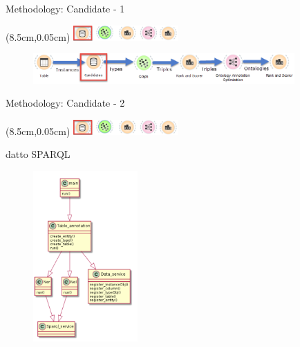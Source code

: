 \documentclass{beamer}
\begin{document}
\begin{frame}{Methodology: Candidate - 1}
	\begin{textblock*}{4cm}(8.5cm,0.05cm) %
		\includegraphics[width=4cm]{images/header-candidate.png}
	\end{textblock*}
	\begin{figure}
		\includegraphics[width=10cm]{images/diagrams-candidate.png}
	\end{figure}
\end{frame}
\begin{frame}{Methodology: Candidate - 2}
	\begin{textblock*}{4cm}(8.5cm,0.05cm) %
		\includegraphics[width=4cm]{images/header-candidate.png}
	\end{textblock*}
	\begin{definition}
		datto SPARQL
	\end{definition}
	\begin{figure}
		\includegraphics[width=4cm]{images/uml-types-diagram2.png}
	\end{figure}
\end{frame}
\end{document}
